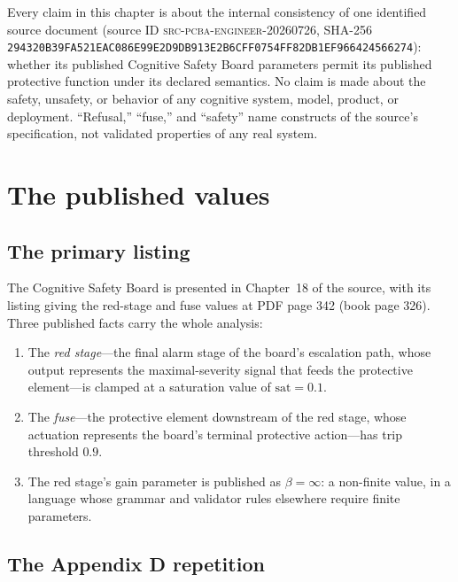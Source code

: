 \begin{boundary}\label{ch11:scope}
Every claim in this chapter is about the internal consistency of one identified source document (source ID \textsc{src-pcba-engineer-20260726}, SHA-256 \texttt{294320B39FA521EAC086E99E2D9DB913E2B6CFF0754FF82DB1EF966424566274}): whether its published Cognitive Safety Board parameters permit its published protective function under its declared semantics. No claim is made about the safety, unsafety, or behavior of any cognitive system, model, product, or deployment. ``Refusal,'' ``fuse,'' and ``safety'' name constructs of the source's specification, not validated properties of any real system.
\end{boundary}

\section{The published values}\label{ch11:values}

\subsection{The primary listing}

The Cognitive Safety Board is presented in Chapter~18 of the source, with its listing giving the red-stage and fuse values at PDF page 342 (book page 326). Three published facts carry the whole analysis:

\begin{enumerate}
\item The \emph{red stage}---the final alarm stage of the board's escalation path, whose output represents the maximal-severity signal that feeds the protective element---is clamped at a saturation value of $\mathrm{sat}=0.1$.
\item The \emph{fuse}---the protective element downstream of the red stage, whose actuation represents the board's terminal protective action---has trip threshold $0.9$.
\item The red stage's gain parameter is published as $\beta=\infty$: a non-finite value, in a language whose grammar and validator rules elsewhere require finite parameters.
\end{enumerate}

\subsection{The Appendix D repetition}

